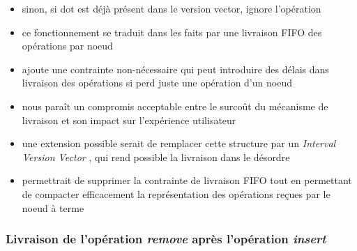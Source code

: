 \documentclass[12pt]{thesul}
\begin{document}
\begin{itemize}
  \item sinon, si dot est déjà présent dans le version vector, ignore l'opération
  \item ce fonctionnement se traduit dans les faits par une livraison FIFO des opérations par noeud
  \item ajoute une contrainte non-nécessaire qui peut introduire des délais dans livraison des opérations si perd juste une opération d'un noeud
  \item nous paraît un compromis acceptable entre le surcoût du mécanisme de livraison et son impact sur l'expérience utilisateur
  \item une extension possible serait de remplacer cette structure par un \emph{Interval Version Vector} \cite{2014-optimized-or-sets}, qui rend possible la livraison dans le désordre
  \item permettrait de supprimer la contrainte de livraison FIFO tout en permettant de compacter efficacement la représentation des opérations reçues par le noeud à terme
\end{itemize}

\subsubsection{Livraison de l'opération \emph{remove} après l'opération \emph{insert}}
\end{document}
